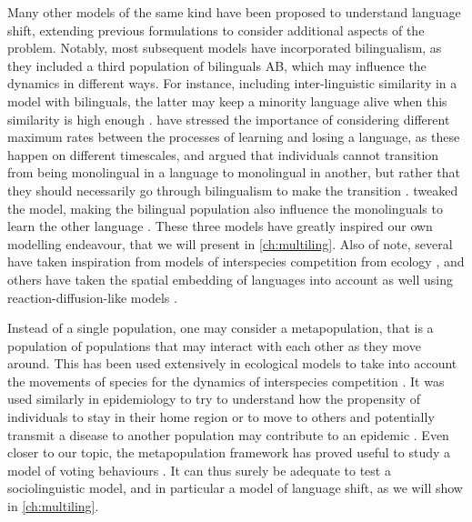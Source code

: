\documentclass[../thesis.tex]{subfiles}
\begin{document}
Many other models of the same kind have been proposed to understand language shift,
extending previous formulations to consider additional aspects of the problem. Notably,
most subsequent models have incorporated bilingualism, as they included a third
population of bilinguals AB, which may influence the dynamics in different ways. For
instance, including inter-linguistic similarity in a model with bilinguals, the latter
may keep a minority language alive when this similarity is high enough
\cite{MiraImportanceInterlinguistic2011}. 
have stressed the importance of considering different maximum rates between the
processes of learning and losing a language, as these happen on different timescales,
and argued that individuals cannot transition from being monolingual in a language to
monolingual in another, but rather that they should necessarily go through bilingualism
to make the transition \cite{MinettModellingEndangered2008}.
 tweaked the model, making the bilingual
population also influence the monolinguals to learn the other language
\cite{HeinsaluRoleBilinguals2014}. These three models have greatly inspired our own
modelling endeavour, that we will present in \cref{ch:multiling}. Also of note, several
have taken inspiration from models of interspecies competition from ecology
\cite{PinascoCoexistenceLanguages2006,KandlerEcologicalModels2008,SoleDiversityCompetition2010},
and others have taken the spatial embedding of languages into account as well using
reaction-diffusion-like models
\cite{KandlerDemographyLanguage2009,PatriarcaInfluenceGeography2009,IsernLanguageExtinction2014,ProchazkaQuantifyingDriving2017}.

Instead of a single population, one may consider a metapopulation, that is a population
of populations that may interact with each other as they move around. This has been used
extensively in ecological models to take into account the movements of species for the
dynamics of interspecies competition \cite{HanskiMetapopulationDynamics1998}. It was
used similarly in epidemiology to try to understand how the propensity of individuals to
stay in their home region or to move to others and potentially transmit a disease to
another population may contribute to an epidemic
\cite{SattenspielStructuredEpidemic1995,BalcanModelingSpatial2010,ApolloniMetapopulationEpidemic2014}.
Even closer to our topic, the metapopulation framework has proved useful to study a
model of voting behaviours \cite{Fernandez-GraciaVoterModel2014}. It can thus surely be
adequate to test a sociolinguistic model, and in particular a model of language shift,
as we will show in \cref{ch:multiling}.
\end{document}

